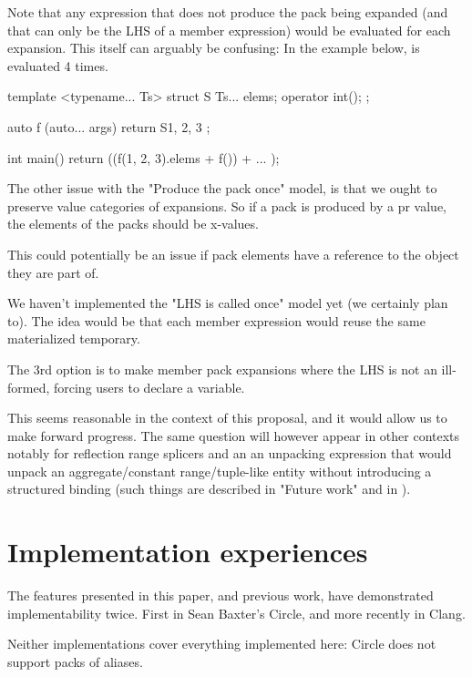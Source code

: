 \documentclass{wg21}
\begin{document}
Note that any expression that does not produce the pack being expanded
(and that can only be the LHS of a member expression) would be evaluated for each expansion.
This itself can arguably be confusing: In the example below,  is evaluated 4 times.

\begin{colorblock}

template <typename... Ts>
struct S {
    Ts... elems;
    operator int();
};

auto f (auto... args) {
    return S{1, 2, 3 };
}

int main() {
    return ((f(1, 2, 3).elems + f()) + ... );
}

\end{colorblock}


The other issue with the "Produce the pack once" model,
is that we ought to preserve value categories of expansions.
So if a pack is produced by a pr value, the elements of the
packs should be x-values.

This could potentially be an issue if pack elements have a reference to the
object they are part of.

We haven't implemented the "LHS is called once" model yet (we certainly plan to).
The idea would be that each member expression would reuse the same materialized temporary.

The 3rd option is to make member pack expansions where the LHS is not an  ill-formed,
forcing users to declare a variable.

This seems reasonable in the context of this proposal, and it would allow us to make forward progress.
The same question will however appear in other contexts notably for reflection range splicers and
an an unpacking expression that would unpack an aggregate/constant range/tuple-like entity without
introducing a structured binding (such things are described in "Future work" and in ).

\section{Implementation experiences}

The features presented in this paper, and previous work, have demonstrated implementability twice.
First in Sean Baxter's Circle, and more recently in Clang.

Neither implementations cover everything implemented here:
Circle does not support packs of aliases.
\end{document}
